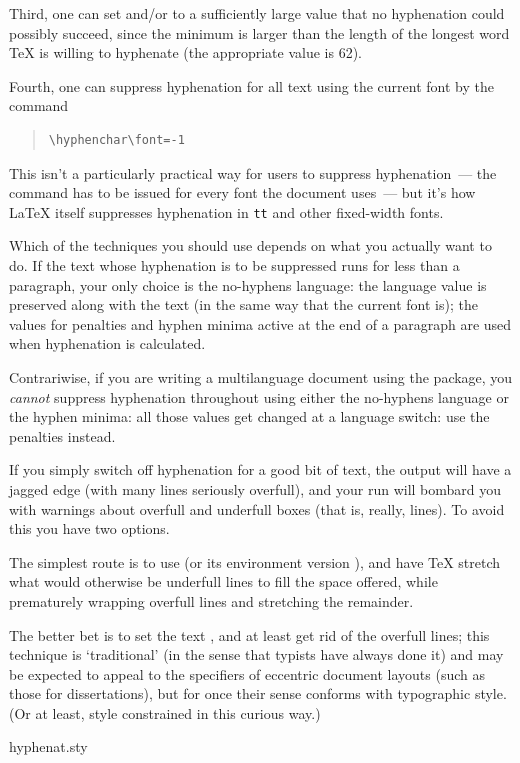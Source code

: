 Third, one can set  and/or  to a
sufficiently large value that no hyphenation could possibly succeed,
since the minimum is larger than the length of the longest word
\TeX{} is willing to hyphenate (the appropriate value is 62).

Fourth, one can suppress hyphenation for all text using the current
font by the command
\begin{quote}
\begin{verbatim}
\hyphenchar\font=-1
\end{verbatim}
\end{quote}
This isn't a particularly practical way for users to suppress
hyphenation~--- the command has to be issued for every font the
document uses~--- but it's how \LaTeX{} itself suppresses hyphenation
in \texttt{tt} and other fixed-width fonts.

Which of the techniques you should use depends on what you actually
want to do.  If the text whose hyphenation is to be suppressed runs
for less than a paragraph, your only choice is the no-hyphens
language: the language value is preserved along with the text (in the
same way that the current font is); the values for penalties and
hyphen minima active at the end of a paragraph are used when
hyphenation is calculated.

Contrariwise, if you are writing a multilanguage document using the
 package, you \emph{cannot} suppress hyphenation
throughout using either the no-hyphens language or the hyphen minima:
all those values get changed at a  language switch: use
the penalties instead.

If you simply switch off hyphenation for a good bit of text, the
output will have a jagged edge (with many lines seriously overfull),
and your \AllTeX{} run will bombard you with warnings about overfull
and underfull boxes (that is, really, lines).  To avoid this you have
two options.

The simplest route is to use  (or its environment version
), and have \TeX{} stretch what would otherwise
be underfull lines to fill the space offered, while prematurely
wrapping overfull lines and stretching the remainder.  

The better bet is to set the text ,
and at least get rid of the overfull lines; this technique is
`traditional' (in the sense that typists have always done it) and may
be expected to 
appeal to the specifiers of eccentric document layouts (such as those
for dissertations), but for once their sense conforms with typographic
style.  (Or at least, style constrained in this curious way.)
\begin{ctanrefs}
\item[hyphenat.sty]
\end{ctanrefs}

